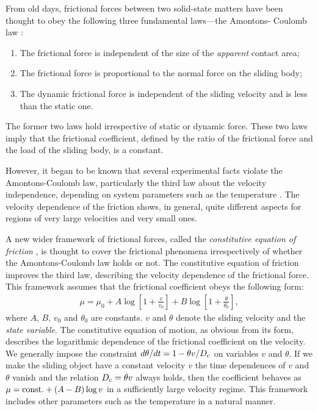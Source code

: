 From old days, frictional forces between two solid-state matters have been thought to obey the following three fundamental laws---the Amontons- Coulomb law \cite{Matsukawa2009Book}:
\begin{enumerate}
	\item The frictional force is independent of the size of the \textit{apparent} contact area;
	\item The frictional force is proportional to the normal force on the sliding body;
	\item The dynamic frictional force is independent of the sliding velocity and is less than the static one.
\end{enumerate}
The former two laws hold irrespective of static or dynamic force. These two laws imply that the frictional coefficient, defined by the ratio of the frictional force and the load of the sliding body, is a constant.

However, it began to be known that several experimental facts violate the Amontons-Coulomb law, particularly the third law about the velocity independence, depending on system parameters such as the temperature \cite{Bouhacina1997,Gnecco2000,Chen2006,Muser2011,Braun2011}. The velocity dependence of the friction shows, in general, quite different aspects for regions of very large velocities and very small ones.

A new wider framework of frictional forces, called the \textit{constitutive equation of friction} \cite{Hashiguchi2016}, is thought to cover the frictional phenomena irrespectively of whether the Amontons-Coulomb law holds or not. The constitutive equation of friction improves the third law, describing the velocity dependence of the frictional force. This framework assumes that the frictional coefficient obeys the following form:
\begin{align}
\mu = \mu_{0} + A\log \left[1+\frac{v}{v_{0}}\right] + B\log \left[1+\frac{\theta}{\theta_{0}}\right],
\end{align}
where $A$, $B$, $v_{0}$ and $\theta_{0}$ are constants. $v$ and $\theta$ denote the sliding velocity and the \textit{state variable}. The constitutive equation of motion, as obvious from its form, describes the logarithmic dependence of the frictional coefficient on the velocity. We generally impose the constraint $d\theta/dt = 1-\theta v/D_{\rm c}$ on variables $v$ and $\theta$. If we make the sliding object have a constant velocity $v$ the time dependences of $v$ and $\theta$ vanish and the relation $D_{\rm c}=\theta v$ always holds, then the coefficient behaves as $\mu={\rm const.} +(A-B)\log v$ in a sufficiently large velocity regime. This framework includes other parameters such as the temperature in a natural manner.

